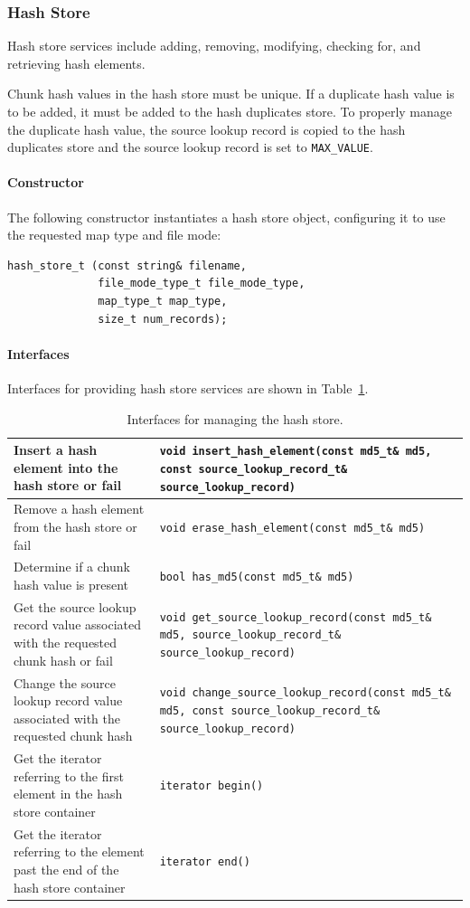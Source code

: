\documentclass[12pt,twoside]{article}
\begin{document}
\subsubsection{Hash Store}
Hash store services include adding, removing, modifying, checking for,
and retrieving hash elements.

Chunk hash values in the hash store must be unique.
If a duplicate hash value is to be added, it must be added to the hash duplicates store.
To properly manage the duplicate hash value,
the source lookup record is copied to the hash duplicates store
and the source lookup record is set to \texttt{MAX\_VALUE}.

\paragraph{Constructor}
The following constructor instantiates a hash store object,
configuring it to use the requested map type and file mode:
\begin{small}
\begin{verbatim}
hash_store_t (const string& filename,
              file_mode_type_t file_mode_type,
              map_type_t map_type,
              size_t num_records);
\end{verbatim}
\end{small}

\paragraph{Interfaces}
Interfaces for providing hash store services
are shown in Table~\ref{hash-store-interfaces}.
\begin{table}[h]
\center
\begin{tabular}{|p{2in}|p{4in}|}
\hline
Insert a hash element into the hash store or fail & \texttt{void insert\_hash\_element(const md5\_t\& md5, const source\_lookup\_record\_t\& source\_lookup\_record)} \\
\hline
Remove a hash element from the hash store or fail & \texttt{void erase\_hash\_element(const md5\_t\& md5)} \\
\hline
Determine if a chunk hash value is present & \texttt{bool has\_md5(const md5\_t\& md5)} \\
\hline
Get the source lookup record value associated with the requested chunk hash or fail & \texttt{void get\_source\_lookup\_record(const md5\_t\& md5, source\_lookup\_record\_t\& source\_lookup\_record)} \\
\hline
Change the source lookup record value associated with the requested chunk hash & \texttt{void change\_source\_lookup\_record(const md5\_t\& md5, const source\_lookup\_record\_t\& source\_lookup\_record)} \\
\hline
Get the iterator referring to the first element in the hash store container & \texttt{iterator begin()} \\
\hline
Get the iterator referring to the element past the end of the hash store container & \texttt{iterator end()} \\
\hline
\end{tabular}
\caption{Interfaces for managing the hash store.\label{hash-store-interfaces}}
\end{table}
\end{document}

